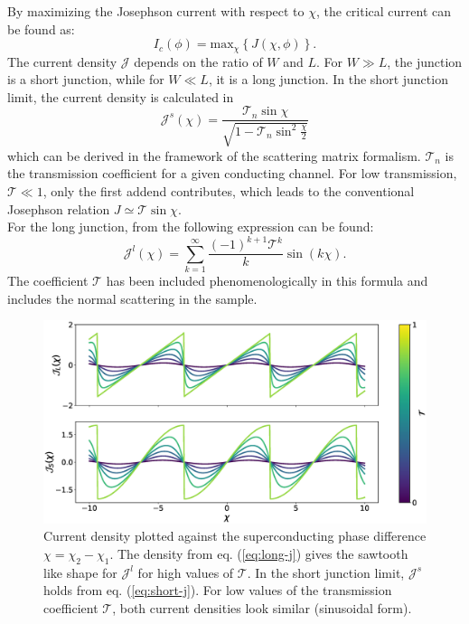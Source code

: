 By maximizing the Josephson current with respect to $\chi$, the critical current can be found as:
\begin{equation}
I_c(\phi) = \text{max}_{\chi}\left\{ J(\chi, \phi) \right\}\label{eq:josephson-relation}.
\end{equation}
The current density $\mathcal{J}$ depends on the ratio of $W$ and $L$. For $W \gg L$, the junction is a short junction, while for $W \ll L$, it is a long junction. 
In the short junction limit, the current density is calculated in \cite{Beenakker1991}
\begin{equation}
\mathcal{J}^s (\chi) = \frac{\mathcal{T}_n \sin \chi}{\sqrt{1 - \mathcal{T}_n \sin^2 \frac{\chi}{2}}}\label{eq:short-j}
\end{equation}
which can be derived in the framework of the scattering matrix formalism. $\mathcal{T}_n$ is the transmission coefficient for a given conducting channel. For low transmission, $\mathcal{T} \ll 1$, only the first addend contributes, which leads to the conventional Josephson relation $J \simeq \mathcal{T} \sin \chi$.\\
For the long junction, from \cite{Barzykin1999} the following expression can be found:
\begin{equation}
\mathcal{J}^l(\chi) = \sum_{k = 1}^{\infty} \frac{(-1)^{k+1} \mathcal{T}^k}{k} \sin( k \chi).\label{eq:long-j}
\end{equation}
The coefficient $\mathcal{T}$ has been included phenomenologically in this formula and includes the normal scattering in the sample.
\begin{figure}
\centering
\includegraphics[width=\textwidth]{figure/analyticalmodel/current_density_all}
\caption{Current density plotted against the superconducting phase difference $\chi = \chi_2 - \chi_1$. The density from eq. (\ref{eq:long-j}) gives the sawtooth like shape for $\mathcal{J}^l$ for high values of $\mathcal{T}$. In the short junction limit, $\mathcal{J}^s$ holds from eq. (\ref{eq:short-j}). For low values of the transmission coefficient $\mathcal{T}$, both current densities look similar (sinusoidal form). }
\label{fig:current_density}
\end{figure}
